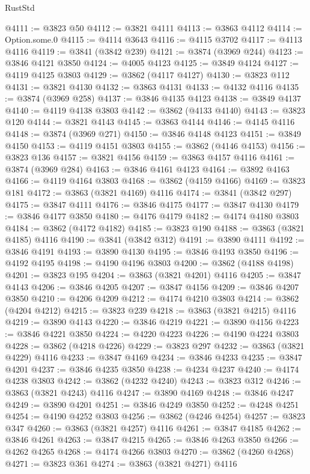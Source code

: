 \begin{lexlean}{RustStd}
\begin{coremodule}
@4111 := @3823 @50
@4112 := @3821 @4111
@4113 := @3863 @4112
@4114 := Option.some.{0}
@4115 := @4114 @3643
@4116 := @4115 @3702
@4117 := @4113 @4116
@4119 := @3841 (@3842 @239)
@4121 := @3874 (@3969 @244)
@4123 := @3846 @4121 @3850
@4124 := @4005 @4123
@4125 := @3849 @4124
@4127 := @4119 @4125 @3803
@4129 := @3862 (@4117 @4127)
@4130 := @3823 @112
@4131 := @3821 @4130
@4132 := @3863 @4131
@4133 := @4132 @4116
@4135 := @3874 (@3969 @258)
@4137 := @3846 @4135 @4123
@4138 := @3849 @4137
@4140 := @4119 @4138 @3803
@4142 := @3862 (@4133 @4140)
@4143 := @3823 @120
@4144 := @3821 @4143
@4145 := @3863 @4144
@4146 := @4145 @4116
@4148 := @3874 (@3969 @271)
@4150 := @3846 @4148 @4123
@4151 := @3849 @4150
@4153 := @4119 @4151 @3803
@4155 := @3862 (@4146 @4153)
@4156 := @3823 @136
@4157 := @3821 @4156
@4159 := @3863 @4157 @4116
@4161 := @3874 (@3969 @284)
@4163 := @3846 @4161 @4123
@4164 := @3892 @4163
@4166 := @4119 @4164 @3803
@4168 := @3862 (@4159 @4166)
@4169 := @3823 @181
@4172 := @3863 (@3821 @4169) @4116
@4174 := @3841 (@3842 @297)
@4175 := @3847 @4111
@4176 := @3846 @4175
@4177 := @3847 @4130
@4179 := @3846 @4177 @3850
@4180 := @4176 @4179
@4182 := @4174 @4180 @3803
@4184 := @3862 (@4172 @4182)
@4185 := @3823 @190
@4188 := @3863 (@3821 @4185) @4116
@4190 := @3841 (@3842 @312)
@4191 := @3890 @4111
@4192 := @3846 @4191
@4193 := @3890 @4130
@4195 := @3846 @4193 @3850
@4196 := @4192 @4195
@4198 := @4190 @4196 @3803
@4200 := @3862 (@4188 @4198)
@4201 := @3823 @195
@4204 := @3863 (@3821 @4201) @4116
@4205 := @3847 @4143
@4206 := @3846 @4205
@4207 := @3847 @4156
@4209 := @3846 @4207 @3850
@4210 := @4206 @4209
@4212 := @4174 @4210 @3803
@4214 := @3862 (@4204 @4212)
@4215 := @3823 @239
@4218 := @3863 (@3821 @4215) @4116
@4219 := @3890 @4143
@4220 := @3846 @4219
@4221 := @3890 @4156
@4223 := @3846 @4221 @3850
@4224 := @4220 @4223
@4226 := @4190 @4224 @3803
@4228 := @3862 (@4218 @4226)
@4229 := @3823 @297
@4232 := @3863 (@3821 @4229) @4116
@4233 := @3847 @4169
@4234 := @3846 @4233
@4235 := @3847 @4201
@4237 := @3846 @4235 @3850
@4238 := @4234 @4237
@4240 := @4174 @4238 @3803
@4242 := @3862 (@4232 @4240)
@4243 := @3823 @312
@4246 := @3863 (@3821 @4243) @4116
@4247 := @3890 @4169
@4248 := @3846 @4247
@4249 := @3890 @4201
@4251 := @3846 @4249 @3850
@4252 := @4248 @4251
@4254 := @4190 @4252 @3803
@4256 := @3862 (@4246 @4254)
@4257 := @3823 @347
@4260 := @3863 (@3821 @4257) @4116
@4261 := @3847 @4185
@4262 := @3846 @4261
@4263 := @3847 @4215
@4265 := @3846 @4263 @3850
@4266 := @4262 @4265
@4268 := @4174 @4266 @3803
@4270 := @3862 (@4260 @4268)
@4271 := @3823 @361
@4274 := @3863 (@3821 @4271) @4116

\end{coremodule}
\end{lexlean}
